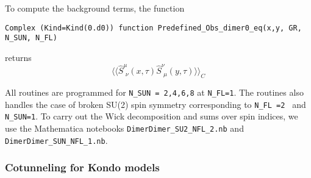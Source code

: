 To compute the background terms, the function
\begin{lstlisting}[style=fortran]
Complex (Kind=Kind(0.d0)) function Predefined_Obs_dimer0_eq(x,y, GR, N_SUN, N_FL)
\end{lstlisting}
returns 
\begin{equation}
 \langle \langle \hat{S}^{\mu}_{\, \,  \nu} (x,\tau)   \hat{S}^{\nu}_{\, \,  \mu} (y,\tau)  \rangle   \rangle_C 
\end{equation} 

All routines  are programmed  for \texttt{N\_SUN = 2,4,6,8} at \texttt{N\_FL=1}.   The routines also handles the case of broken SU(2)  spin symmetry corresponding  to  \texttt{N\_FL =2 }  and \texttt{N\_SUN=1}.   To carry out the Wick decomposition  and sums over  spin indices,  we use the  Mathematica  notebooks 
 \texttt{Dimer\-Dimer\_SU2\_NFL\_2.nb}  and \texttt{Dimer\-Dimer\_SUN\_NFL\_1.nb}.


\subsubsection{Cotunneling for Kondo models}

